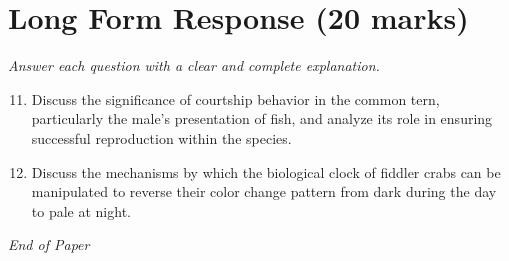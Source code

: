 \documentclass[12pt]{article}
\begin{document}
\section*{Long Form Response (20 marks)}
\textit{Answer each question with a clear and complete explanation.}
\begin{enumerate}[label=\arabic*.]
\setcounter{enumi}{10}
\item Discuss the significance of courtship behavior in the common tern, particularly the male's presentation of fish, and analyze its role in ensuring successful reproduction within the species.
\item Discuss the mechanisms by which the biological clock of fiddler crabs can be manipulated to reverse their color change pattern from dark during the day to pale at night.
\end{enumerate}

\vfill
\noindent\textit{End of Paper}
\end{document}

